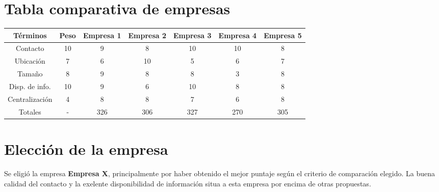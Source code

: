 \section{Tabla comparativa de empresas}
\begin{center}
\small\addtolength{\tabcolsep}{-5pt}
\begin{tabular}{|| c || c || c | c | c | c | c ||}
\hline
\hline
T\'{e}rminos & Peso & Empresa 1 & Empresa 2 & Empresa 3 & Empresa 4 & Empresa 5\\
\hline
Contacto   & 10 & 9 & 8 & 10 & 10 & 8 \\
\hline
Ubicaci\'{o}n & 7 & 6 & 10 & 5 & 6 & 7 \\
\hline
Tama\~{n}o & 8 & 9 & 8 & 8 & 3 & 8 \\
\hline
Disp. de info. & 10 & 9 & 6 & 10 & 8 & 8 \\
\hline
Centralizaci\'{o}n & 4 & 8 & 8 & 7 & 6 & 8 \\
\hline
\hline
Totales & - & 326 & 306 & 327 & 270 & 305 \\
\hline
\end{tabular}
\end{center}



\section{Elección de la empresa}
Se eligió la empresa \textbf{Empresa X}, principalmente por haber obtenido el mejor puntaje según el criterio de comparación elegido. La buena calidad del contacto y la exelente disponibilidad de información situa a esta empresa por encima de otras propuestas.

\pagebreak
